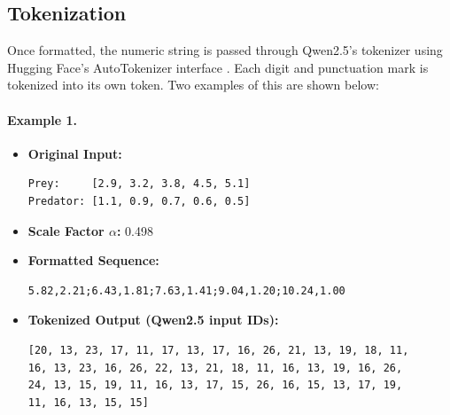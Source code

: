 \documentclass[a4paper,12pt]{article}
\begin{document}
\subsection*{Tokenization}

Once formatted, the numeric string is passed through Qwen2.5’s tokenizer using Hugging Face’s AutoTokenizer interface \cite{huggingface}. Each digit and punctuation mark is tokenized into its own token. Two examples of this are shown below:

\paragraph{Example 1.}
\begin{itemize}
  \item \textbf{Original Input:}
  \begin{verbatim}
Prey:     [2.9, 3.2, 3.8, 4.5, 5.1]
Predator: [1.1, 0.9, 0.7, 0.6, 0.5]
  \end{verbatim}

  \vspace{-0.7cm}

  \item \textbf{Scale Factor $\alpha$:} 0.498


  \item \textbf{Formatted Sequence:}
  \begin{verbatim}
5.82,2.21;6.43,1.81;7.63,1.41;9.04,1.20;10.24,1.00
  \end{verbatim}

  \vspace{-0.7cm}

  \item \textbf{Tokenized Output (Qwen2.5 input IDs):}
  \begin{verbatim}
[20, 13, 23, 17, 11, 17, 13, 17, 16, 26, 21, 13, 19, 18, 11,
16, 13, 23, 16, 26, 22, 13, 21, 18, 11, 16, 13, 19, 16, 26,
24, 13, 15, 19, 11, 16, 13, 17, 15, 26, 16, 15, 13, 17, 19,
11, 16, 13, 15, 15]
  \end{verbatim}
\end{itemize}

\vspace{-1cm}
\end{document}
